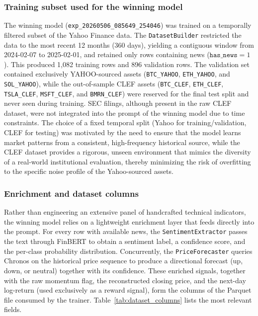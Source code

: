     \subsubsection{Training subset used for the winning model}
    \label{sec:trainingsubset}

    The winning model (\texttt{exp\_20260506\_085649\_254046}) was trained on a temporally filtered subset of the Yahoo Finance data. The \texttt{DatasetBuilder} restricted the data to the most recent 12 months (360 days), yielding a contiguous window from 2024-02-07 to 2025-02-01, and retained only rows containing news ($\texttt{has\_news}=1$). This produced 1,082 training rows and 896 validation rows. The validation set contained exclusively YAHOO-sourced assets (\texttt{BTC\_YAHOO}, \texttt{ETH\_YAHOO}, and \texttt{SOL\_YAHOO}), while the out-of-sample CLEF assets (\texttt{BTC\_CLEF}, \texttt{ETH\_CLEF}, \texttt{TSLA\_CLEF}, \texttt{MSFT\_CLEF}, and \texttt{BMRN\_CLEF}) were reserved for the final test split and never seen during training. SEC filings, although present in the raw CLEF dataset, were not integrated into the prompt of the winning model due to time constraints. The choice of a fixed temporal split (Yahoo for training/validation, CLEF for testing) was motivated by the need to ensure that the model learns market patterns from a consistent, high-frequency historical source, while the CLEF dataset provides a rigorous, unseen environment that mimics the diversity of a real-world institutional evaluation, thereby minimizing the risk of overfitting to the specific noise profile of the Yahoo-sourced assets.

    \subsubsection{Enrichment and dataset columns}
    \label{sec:enrichment}

    Rather than engineering an extensive panel of handcrafted technical indicators, the winning model relies on a lightweight enrichment layer that feeds directly into the prompt. For every row with available news, the \texttt{SentimentExtractor} passes the text through FinBERT to obtain a sentiment label, a confidence score, and the per-class probability distribution. Concurrently, the \texttt{PriceForecaster} queries Chronos on the historical price sequence to produce a directional forecast (up, down, or neutral) together with its confidence. These enriched signals, together with the raw momentum flag, the reconstructed closing price, and the next-day log-return (used exclusively as a reward signal), form the columns of the Parquet file consumed by the trainer.  Table~\ref{tab:dataset_columns} lists the most relevant fields.
    
